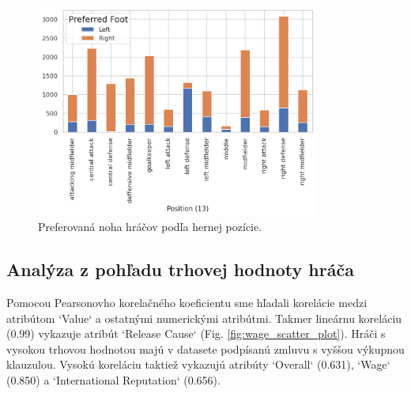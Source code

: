 \documentclass[runningheads]{llncs}
\begin{document}
\begin{figure}[htp]
    \centering
    \includegraphics[height=7cm]{images/preferred_foot_counts}
    \caption{Preferovaná noha hráčov podľa hernej pozície.}
    \label{fig:preferred_foot_counts}
\end{figure}


\subsection{Analýza z pohľadu trhovej hodnoty hráča} \label{analyza_z_pohladu_trhovej_hodnoty}
Pomocou Pearsonovho korelačného koeficientu sme hľadali korelácie medzi atribútom `Value` a ostatnými numerickými atribútmi. Takmer lineárnu koreláciu (0.99) vykazuje atribút `Release Cause` (Fig. \ref{fig:wage_scatter_plot}). Hráči s vysokou trhovou hodnotou majú v datasete podpísanú zmluvu s vyššou výkupnou klauzulou. Vysokú koreláciu taktiež vykazujú atribúty `Overall` (0.631), `Wage` (0.850) a `International Reputation` (0.656).
\end{document}
